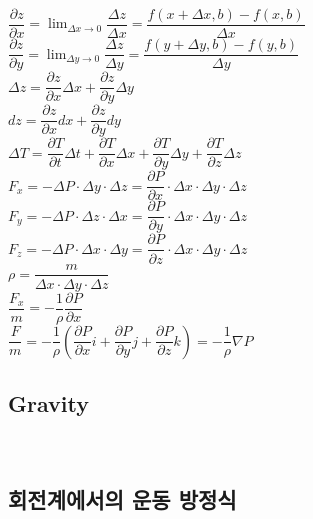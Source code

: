 $\dfrac{\partial z}{\partial x} = \displaystyle \lim_{\Delta x \rightarrow 0} \dfrac { \Delta z}{\Delta x } 
= \dfrac {f\left(x + \Delta x, b \right) - f\left(x, b \right)}{ \Delta x}$\\

$\dfrac{\partial z}{\partial y} = \displaystyle \lim_{\Delta y \rightarrow 0} \dfrac { \Delta z}{\Delta y } 
= \dfrac {f\left(y + \Delta y, b \right) - f\left(y, b \right)}{ \Delta y}$\\

$ \Delta z = \dfrac{\partial z}{\partial x} \Delta x + \dfrac{\partial z}{\partial y} \Delta y $\\

$ dz = \dfrac{\partial z}{\partial x} dx + \dfrac{\partial z}{\partial y} dy $\\


$ \Delta T = \dfrac{\partial T}{\partial t} \Delta t 
+ \dfrac{\partial T}{\partial x} \Delta x 
+ \dfrac{\partial T}{\partial y} \Delta y 
+ \dfrac{\partial T}{\partial z} \Delta z $\\

$ F_{x} = - \Delta P \cdot \Delta y \cdot \Delta z 
= \dfrac{\partial P}{\partial x} \cdot \Delta x \cdot \Delta y \cdot \Delta z $\\

$ F_{y} = - \Delta P \cdot \Delta z \cdot \Delta x 
= \dfrac{\partial P}{\partial y} \cdot \Delta x \cdot \Delta y \cdot \Delta z $\\

$ F_{z} = - \Delta P \cdot \Delta x \cdot \Delta y 
= \dfrac{\partial P}{\partial z} \cdot \Delta x \cdot \Delta y \cdot \Delta z $\\

$ \rho = \dfrac {m}{\Delta x \cdot \Delta y \cdot \Delta z} $ \\

$ \dfrac {F_{x}}{m} = - \dfrac{1}{\rho} \dfrac{\partial P}{\partial x} $ \\

$ \dfrac {F}{m} = - \dfrac{1}{\rho} \left( \dfrac{\partial P}{\partial x} i + \dfrac{\partial P}{\partial y} j + \dfrac{\partial P}{\partial z} k \right) 
= - \dfrac{1}{\rho} \nabla P$ \\


\subsection{Gravity}\

\subsection{회전계에서의 운동 방정식}


